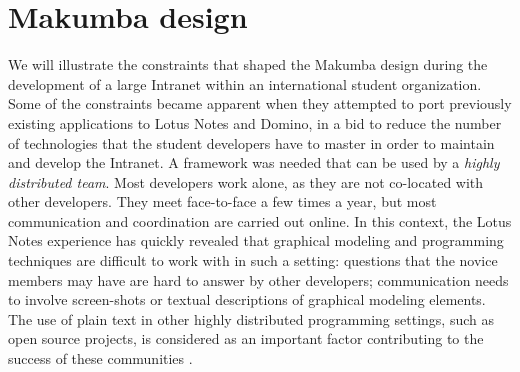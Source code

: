 \documentclass{chi2009}
\begin{document}
\section{Makumba design}\label{sec:makumba}


We will illustrate the constraints that shaped the Makumba design during the development of a large Intranet within an international student organization.  Some of the constraints became apparent when they attempted to port previously existing applications to Lotus Notes and Domino, in a bid to reduce the number of technologies that the student developers have to master in order to maintain and develop the Intranet. %
A framework was needed that can be used by a \textit{highly distributed team}. Most developers work alone, as they are not co-located with other developers. They meet face-to-face a few times a year, but most communication and coordination are carried out online. In this context, the Lotus Notes experience has quickly revealed that graphical modeling and programming techniques are difficult to work with in such a setting: questions that the novice members may have are hard to answer by other developers; communication needs to involve screen-shots or textual descriptions of graphical modeling elements. The use of plain text in other highly distributed programming settings, such as open source projects, is considered as an important factor contributing to the success of these communities \cite{yamauchi00}. 
\end{document}
